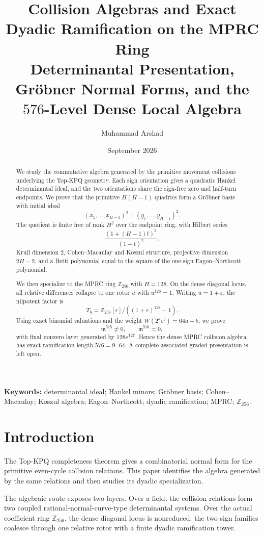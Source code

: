 \documentclass[11pt]{article}
\title{\textbf{Collision Algebras and Exact Dyadic Ramification on the MPRC Ring}\\
Determinantal Presentation, Gröbner Normal Forms, and the $576$-Level Dense Local Algebra}
\author{Muhammad Arshad}
\date{September 2026}
\theoremstyle{definition}
\newcommand{\Z}{\mathbb{Z}}
\begin{document}
\maketitle

\begin{abstract}
We study the commutative algebra generated by the primitive movement collisions underlying the Top-KPQ geometry. Each sign orientation gives a quadratic Hankel determinantal ideal, and the two orientations share the sign-free zero and half-turn endpoints. We prove that the primitive $H(H-1)$ quadrics form a Gröbner basis with initial ideal
\[
(x_1,\ldots,x_{H-1})^2+(y_1,\ldots,y_{H-1})^2.
\]
The quotient is finite free of rank $H^2$ over the endpoint ring, with Hilbert series
\[
\frac{(1+(H-1)t)^2}{(1-t)^2},
\]
Krull dimension $2$, Cohen--Macaulay and Koszul structure, projective dimension $2H-2$, and a Betti polynomial equal to the square of the one-sign Eagon--Northcott polynomial.

We then specialize to the MPRC ring $\Z_{256}$ with $H=128$. On the dense diagonal locus, all relative differences collapse to one rotor $u$ with $u^{128}=1$. Writing $u=1+\varepsilon$, the nilpotent factor is
\[
T_8=\Z_{256}[\varepsilon]/((1+\varepsilon)^{128}-1).
\]
Using exact binomial valuations and the weight $W(2^a\varepsilon^b)=64a+b$, we prove
\[
\mathfrak m^{575}\ne0,\qquad \mathfrak m^{576}=0,
\]
with final nonzero layer generated by $128\varepsilon^{127}$. Hence the dense MPRC collision algebra has exact ramification length $576=9\cdot64$. A complete associated-graded presentation is left open.
\end{abstract}

\noindent\textbf{Keywords:} determinantal ideal; Hankel minors; Gröbner basis; Cohen--Macaulay; Koszul algebra; Eagon--Northcott; dyadic ramification; MPRC; $\Z_{256}$.

\section{Introduction}
The Top-KPQ completeness theorem gives a combinatorial normal form for the primitive even-cycle collision relations. This paper identifies the algebra generated by the same relations and then studies its dyadic specialization.

The algebraic route exposes two layers. Over a field, the collision relations form two coupled rational-normal-curve-type determinantal systems. Over the actual coefficient ring $\Z_{256}$, the dense diagonal locus is nonreduced: the two sign families coalesce through one relative rotor with a finite dyadic ramification tower.
\end{document}
